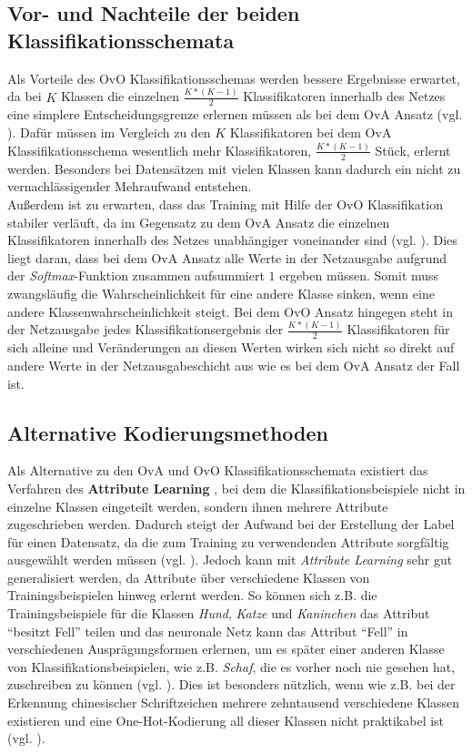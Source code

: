 \subsection{Vor- und Nachteile der beiden Klassifikationsschemata}
Als Vorteile des OvO Klassifikationsschemas werden bessere Ergebnisse erwartet, da bei $K$ Klassen die einzelnen $\frac{K*(K-1)}{2}$ Klassifikatoren innerhalb des Netzes eine simplere Entscheidungsgrenze erlernen müssen als bei dem OvA Ansatz (vgl. \cite{pawaraPaper}).
Dafür müssen im Vergleich zu den $K$ Klassifikatoren bei dem OvA Klassifikationsschema wesentlich mehr Klassifikatoren, $\frac{K*(K-1)}{2}$ Stück, erlernt werden. Besonders bei Datensätzen mit vielen Klassen kann dadurch ein nicht zu vernachlässigender Mehraufwand entstehen.\\

Außerdem ist zu erwarten, dass das Training mit Hilfe der OvO Klassifikation stabiler verläuft, da im Gegensatz zu dem OvA Ansatz die einzelnen Klassifikatoren innerhalb des Netzes unabhängiger voneinander sind (vgl. \cite{pawaraPaper}). Dies liegt daran, dass bei dem OvA Ansatz alle Werte in der Netzausgabe aufgrund der \textit{Softmax}-Funktion zusammen aufsummiert $1$ ergeben müssen. Somit muss zwangsläufig die Wahrscheinlichkeit für eine andere Klasse sinken, wenn eine andere Klassenwahrscheinlichkeit steigt. Bei dem OvO Ansatz hingegen steht in der Netzausgabe jedes Klassifikationsergebnis der $\frac{K*(K-1)}{2}$ Klassifikatoren für sich alleine und Veränderungen an diesen Werten wirken sich nicht so direkt auf andere Werte in der Netzausgabeschicht aus wie es bei dem OvA Ansatz der Fall ist.
\newpage
\subsection{Alternative Kodierungsmethoden}
Als Alternative zu den OvA und OvO Klassifikationsschemata existiert das Verfahren des \textbf{Attribute Learning} \cite{attributeLearning, attributeLearningChinese}, bei dem die Klassifikationsbeispiele nicht in einzelne Klassen eingeteilt werden, sondern ihnen mehrere Attribute zugeschrieben werden. Dadurch steigt der Aufwand bei der Erstellung der Label für einen Datensatz, da die zum Training zu verwendenden Attribute sorgfältig ausgewählt werden müssen (vgl. \cite{pawaraPaper}). Jedoch kann mit \textit{Attribute Learning} sehr gut generalisiert werden, da Attribute über verschiedene Klassen von Trainingsbeispielen hinweg erlernt werden. So können sich z.B. die Trainingsbeispiele für die Klassen \textit{Hund}, \textit{Katze} und \textit{Kaninchen} das Attribut \enquote{besitzt Fell} teilen und das neuronale Netz kann das Attribut \enquote{Fell} in verschiedenen Ausprägungsformen erlernen, um es später einer anderen Klasse von Klassifikationsbeispielen, wie z.B. \textit{Schaf}, die es vorher noch nie gesehen hat, zuschreiben zu können (vgl. \cite{attributeLearning}). Dies ist besonders nützlich, wenn wie z.B. bei der Erkennung chinesischer Schriftzeichen mehrere zehntausend verschiedene Klassen existieren und eine One-Hot-Kodierung all dieser Klassen nicht praktikabel ist (vgl. \cite{attributeLearningChinese}).\\

